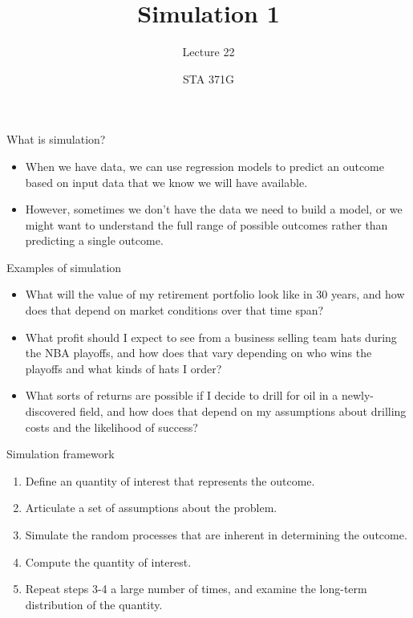 \documentclass{beamer}\usepackage[]{graphicx}\usepackage[]{color}
\title{Simulation 1}
\subtitle{Lecture 22}
\author{STA 371G}
\begin{document}
  
  

  \frame{\maketitle}



  \begin{darkframes}
    \begin{frame}{What is simulation?}
      \begin{itemize}[<+->]
        \item When we have data, we can use regression models to predict an outcome based on input data that we know we will have available.
        \item However, sometimes we don't have the data we need to build a model, or we might want to understand the full range of possible outcomes rather than predicting a single outcome.
      \end{itemize}
    \end{frame}

    \begin{frame}{Examples of simulation}
      \begin{itemize}
        \item What will the value of my retirement portfolio look like in 30 years, and how does that depend on market conditions over that time span?
        \item What profit should I expect to see from a business selling team hats during the NBA playoffs, and how does that vary depending on who wins the playoffs and what kinds of hats I order?
        \item What sorts of returns are possible if I decide to drill for oil in a newly-discovered field, and how does that depend on my assumptions about drilling costs and the likelihood of success?
      \end{itemize}
    \end{frame}

    \begin{frame}{Simulation framework}
      \begin{enumerate}
        \item Define an quantity of interest that represents the outcome.
        \item Articulate a set of assumptions about the problem.
        \item Simulate the random processes that are inherent in determining the outcome.
        \item Compute the quantity of interest.
        \item Repeat steps 3-4 a large number of times, and examine the long-term distribution of the quantity.
      \end{enumerate}


\end{frame}
\end{darkframes}
\end{document}
